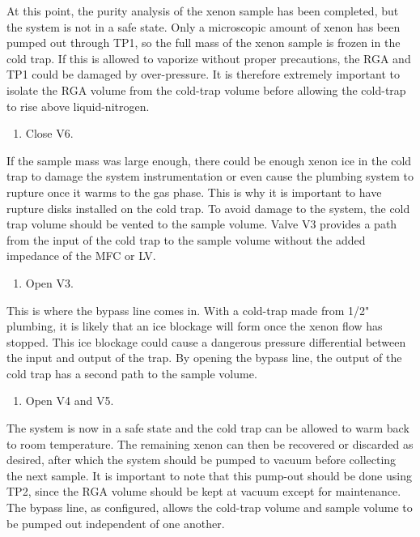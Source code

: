 \noindent At this point, the purity analysis of the xenon sample has been completed, but the system is not in a safe state. Only a microscopic amount of xenon has been pumped out through TP1, so the full mass of the xenon sample is frozen in the cold trap. If this is allowed to vaporize without proper precautions, the RGA and TP1 could be damaged by  over-pressure. It is therefore extremely important to isolate the RGA volume from the cold-trap volume before allowing the cold-trap to rise above liquid-nitrogen.
\begin{enumerate}[resume]
\item \label{step:analysis_stop} Close V6.
\end{enumerate}
\noindent If the sample mass was large enough, there could be enough xenon ice in the cold trap to damage the system instrumentation or even cause the plumbing system to rupture once it warms to the gas phase. This is why it is important to have rupture disks installed on the cold trap. To avoid damage to the system, the cold trap volume should be vented to the sample volume. Valve V3 provides a path from the input of the cold trap to the sample volume without the added impedance of the MFC or LV.
\begin{enumerate}[resume]
\item Open V3. 
\end{enumerate}
\noindent This is where the bypass line comes in. With a cold-trap made from 1/2" plumbing, it is likely that an ice blockage will form once the xenon flow has stopped. This ice blockage could cause a dangerous pressure differential between the input and output of the trap. By opening the bypass line, the output of the cold trap has a second path to the sample volume.
\begin{enumerate}[resume]
\item Open V4 and V5. 
\end{enumerate}

The system is now in a safe state and the cold trap can be allowed to warm back to room temperature. The remaining xenon can then be recovered or discarded as desired, after which the system should be pumped to vacuum before collecting the next sample. It is important to note that this pump-out should be done using TP2, since the RGA volume should be kept at vacuum except for maintenance. The bypass line, as configured, allows the cold-trap volume and sample volume to be pumped out independent of one another.

